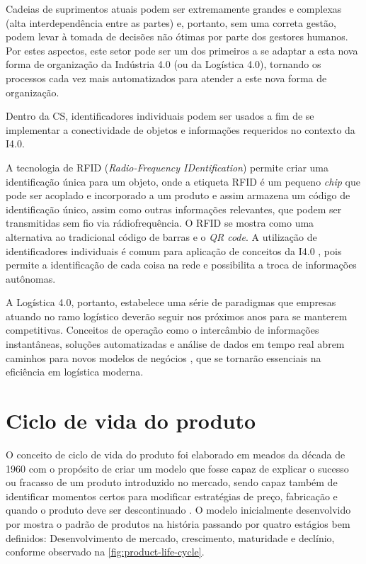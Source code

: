 	Cadeias de suprimentos atuais podem ser extremamente grandes e complexas (alta interdependência entre as partes) e, portanto, sem uma correta gestão, podem levar à tomada de decisões não ótimas por parte dos gestores humanos. Por estes aspectos, este setor pode ser um dos primeiros a se adaptar a esta nova forma de organização da Indústria 4.0 (ou da Logística 4.0), tornando os processos cada vez mais automatizados para atender a este nova forma de organização.

	Dentro da CS, identificadores individuais podem ser usados a fim de se implementar a conectividade de objetos e informações requeridos no contexto da I4.0. 
	
	A tecnologia de RFID (\textit{Radio-Frequency IDentification}) permite criar uma identificação única para um objeto, onde a etiqueta RFID é um pequeno \textit{chip} que pode ser acoplado e incorporado a um produto e assim armazena um código de identificação único, assim como outras informações relevantes, que podem ser transmitidas sem fio via rádiofrequência. O RFID se mostra como uma alternativa ao tradicional código de barras e o \textit{QR code}. A utilização de identificadores individuais é comum para aplicação de conceitos da I4.0 \cite{alyahya2016rfidwarehousing, vlachos2014rfidimpact, fan2015inventory, bibi2017rfidfood}, pois permite a identificação de cada coisa na rede e possibilita a troca de informações autônomas.
	
	A Logística 4.0, portanto, estabelece uma série de paradigmas que empresas atuando no ramo logístico deverão seguir nos próximos anos para se manterem competitivas. Conceitos de operação como o intercâmbio de informações instantâneas, soluções automatizadas e análise de dados em tempo real abrem caminhos para novos modelos de negócios \cite{strandhagen2017logistics}, que se tornarão essenciais na eficiência em logística moderna.

	
	\section{Ciclo de vida do produto}
	
	O conceito de ciclo de vida do produto foi elaborado em meados da década de 1960 com o propósito de criar um modelo que fosse capaz de explicar o sucesso ou fracasso de um produto introduzido no mercado, sendo capaz também de identificar momentos certos para modificar estratégias de preço, fabricação e quando o produto deve ser descontinuado \cite{cao2012lifecycle}. O modelo inicialmente desenvolvido por  mostra o padrão de produtos na história passando por quatro estágios bem definidos: Desenvolvimento de mercado, crescimento, maturidade e declínio, conforme observado na \autoref{fig:product-life-cycle}.
	

